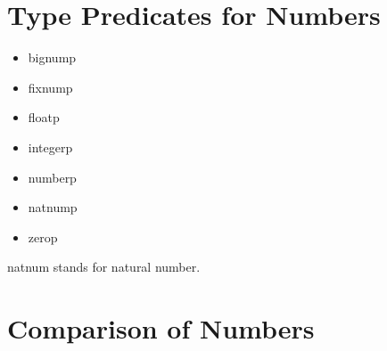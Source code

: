 \section{Type Predicates for Numbers}
\label{sec:type-pred-numb}

\begin{itemize}
\item bignump 
\item fixnump 
\item floatp 
\item integerp
\item numberp 
\item natnump
\item zerop 
\end{itemize}

natnum stands for natural number.

\section{Comparison of Numbers}
\label{sec:comparison-numbers}

